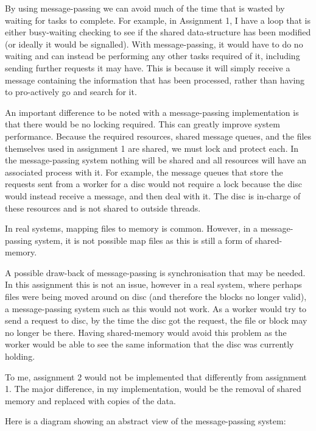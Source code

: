 \documentclass[12pt]{article}
\begin{document}
By using message-passing we can avoid much of the time that is wasted by waiting for tasks to complete. For example, in Assignment 1, I have a loop that is either busy-waiting checking to see if the shared data-structure has been modified (or ideally it would be signalled). With message-passing, it would have to do no waiting and can instead be performing any other tasks required of it, including sending further requests it may have. This is because it will simply receive a message containing the information that has been processed, rather than having to pro-actively go and search for it.

An important difference to be noted with a message-passing implementation is that there would be no locking required. This can greatly improve system performance. Because the required resources, shared message queues, and the files themselves used in assignment 1 are shared, we must lock and protect each. In the message-passing system nothing will be shared and all resources will have an associated process with it. For example, the message queues that store the requests sent from a worker for a disc would not require a lock because the disc would instead receive a message, and then deal with it. The disc is in-charge of these resources and is not shared to outside threads.

In real systems, mapping files to memory is common. However, in a message-passing system, it is not possible map files as this is still a form of shared-memory.

A possible draw-back of message-passing is synchronisation that may be needed. In this assignment this is not an issue, however in a real system, where perhaps files were being moved around on disc (and therefore the blocks no longer valid), a message-passing system such as this would not work. As a worker would try to send a request to disc, by the time the disc got the request, the file or block may no longer be there. Having shared-memory would avoid this problem as the worker would be able to see the same information that the disc was currently holding.

To me, assignment 2 would not be implemented that differently from assignment 1. The major difference, in my implementation, would be the removal of shared memory and replaced with copies of the data. 

Here is a diagram showing an abstract view of the message-passing system:
\end{document}
